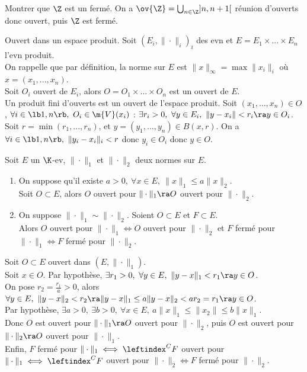 \documentclass[11pt]{article}
\begin{document}
\begin{ex}{}{}
    Montrer que $\Z$ est un fermé.
    \tcblower
    On a $\ov{\Z}=\bigcup_{n\in\Z}]n,n+1[$ réunion d'ouverts donc ouvert, puis $\Z$ est fermé.
\end{ex}

\vspace*{-0.8cm}

\begin{prop}{Ouvert dans un espace produit.}{}
    Soit $(E_i,\|\cdot\|_i)_i$ des evn et $E=E_1\times...\times E_n$ l'evn produit.\\
    On rappelle que par définition, la norme sur $E$ est $\|x\|_\infty=\max\|x_i\|_i$ où $x=(x_1,...,x_n)$.\\
    Soit $O_i$ ouvert de $E_i$, alors $O=O_1\times...\times O_n$ est un ouvert de $E$.\\
    Un produit fini d'ouverts est un ouvert de l'espace produit.
    \tcblower
    Soit $(x_1,...,x_n)\in O$, $\forall i \in \lb1,n\rb, ~ O_i\in \m{V}(x_i)$ : $\exists r_i > 0, ~ \forall y \in E_i, ~ \|y-x_i\|<r_i \ra y \in O_i$.\\
    Soit $r=\min(r_1,...,r_n)$, et $y=(y_1,...,y_n)\in B(x,r)$. On a $\forall i \in \lb1,n\rb, ~ \|y_i-x_i\|_i < r$ donc $y_i \in O_i$ donc $y \in O$.
\end{prop}

\vspace*{-0.8cm}

\begin{prop}{}{}
    Soit $E$ un $\K$-ev, $\|\cdot\|_1$ et $\|\cdot\|_2$ deux normes sur $E$.
    \begin{enumerate}
        \item On suppose qu'il existe $a>0, ~ \forall x \in E, ~ \|x\|_1\leq a\|x\|_2$.\\
        Soit $O\subset E$, alors $O$ ouvert pour $\|\cdot\|_1 \ra O$ ouvert pour $\|\cdot\|_2$.
        \item On suppose $\|\cdot\|_1\sim\|\cdot\|_2$. Soient $O\subset E$ et $F\subset E$.\\
        Alors $O$ ouvert pour $\|\cdot\|_1\iff O$ ouvert pour $\|\cdot\|_2$ et $F$ fermé pour $\|\cdot\|_1\iff F$ fermé pour $\|\cdot\|_2$.
    \end{enumerate}
    \tcblower
     Soit $O\subset E$ ouvert dans $(E,\|\cdot\|_1)$.\\
    Soit $x\in O$. Par hypothèse, $\exists r_1 > 0, ~ \forall y \in E, ~ \|y-x\|_1<r_1 \ra y \in O$.\\
    On pose $r_2=\frac{r_1}{a}>0$, alors $\forall y \in E, ~ \|y-x\|_2<r_2 \ra \|y-x\|_1\leq a\|y-x\|_2<ar_2=r_1\ra y\in O$.\\
     Par hypothèse, $\exists a > 0, ~ \exists b > 0, ~ \forall x \in E, ~ a\|x\|_1\leq\|x_2\|\leq b\|x\|_1$.\\
    Donc $O$ est ouvert pour $\|\cdot\|_1 \ra O$ ouvert pour $\|\cdot\|_2$, puis $O$ est ouvert pour $\|\cdot\|_2 \ra O$ ouvert pour $\|\cdot\|_1$.\\
    Enfin, $F$ fermé pour $\|\cdot\|_1 \iff \leftindex^CF$ ouvert pour $\|\cdot\|_1 \iff \leftindex^CF$ ouvert pour $\|\cdot\|_2\iff F$ fermé pour $\|\cdot\|_2$.
\end{prop}
\end{document}
